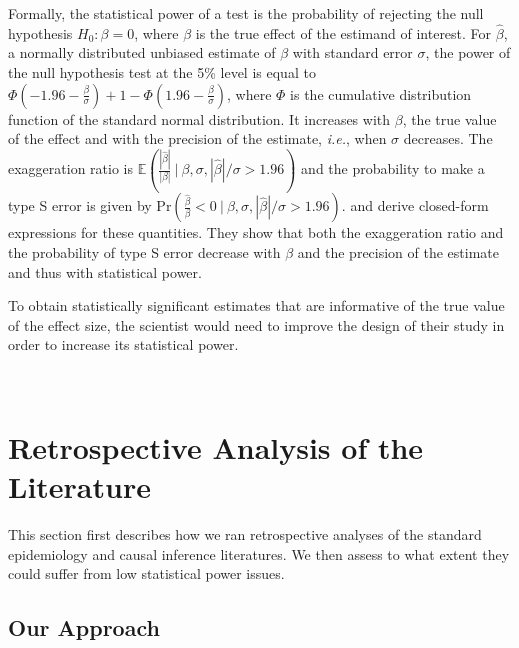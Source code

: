 \documentclass[12pt]{article}
\begin{document}
    Formally, the statistical power of a test is the probability of rejecting the null hypothesis $H_{0}: \beta = 0$, where $\beta$ is the true effect of the estimand of interest. For $\hat{\beta}$, a normally distributed unbiased estimate of $\beta$ with standard error $\sigma$, the power of the null hypothesis test at the 5\% level is equal to $\Phi\left(-1.96-\frac{\beta}{\sigma}\right)+1-\Phi\left(1.96-\frac{\beta}{\sigma}\right)$, where $\Phi$ is the cumulative distribution function of the standard normal distribution. It increases with $\beta$, the true value of the effect and with the precision of the estimate, \textit{i.e.}, when $\sigma$ decreases. The exaggeration ratio is $\mathbb{E}\left(\frac{|\hat{\beta}|}{|\beta|} \ \bigg| \ \beta, \sigma, |\hat{\beta}|/\sigma>1.96\right)$ and the probability to make a type S error is given by $\text{Pr}\left(\frac{\hat{\beta}}{\beta} < 0 \ \bigg| \ \beta, \sigma, |\hat{\beta}|/\sigma>1.96 \right)$.  \cite{zwet_significance_2021} and \cite{lu_note_2019} derive closed-form expressions for these quantities. They show that both the exaggeration ratio and the probability of type S error decrease with $\beta$ and the precision of the estimate and thus with statistical power. %

    To obtain statistically significant estimates that are informative of the true value of the effect size, the scientist would need to improve the design of their study in order to increase its statistical power.
    


~
\section{Retrospective Analysis of the Literature}\label{section_lit_review}

    This section first describes how we ran retrospective analyses of the standard epidemiology and causal inference literatures. We then assess to what extent they could suffer from low statistical power issues.
    
    \subsection{Our Approach}
    
\end{document}
